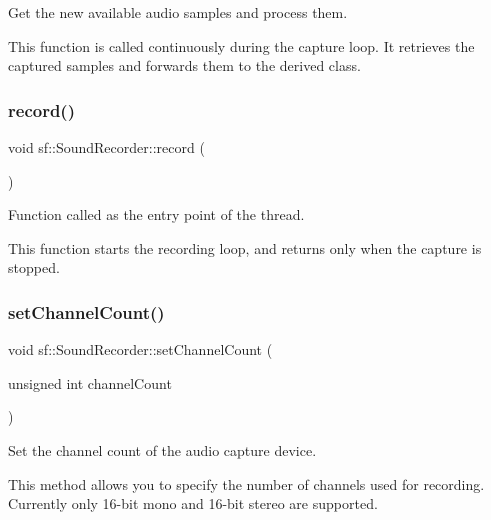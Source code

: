 Get the new available audio samples and process them. 

This function is called continuously during the capture loop. It retrieves the captured samples and forwards them to the derived class. \begin{DoxyVerb}\end{DoxyVerb}
 \mbox{\label{classsf_1_1_sound_recorder_ac7da8331c382707623dc3671094fc176}} 
\subsubsection{\texorpdfstring{record()}{record()}}
{\footnotesize\ttfamily void sf\+::\+Sound\+Recorder\+::record (\begin{DoxyParamCaption}{ }\end{DoxyParamCaption})\hspace{0.3cm}{\ttfamily [private]}}



Function called as the entry point of the thread. 

This function starts the recording loop, and returns only when the capture is stopped. \begin{DoxyVerb}\end{DoxyVerb}
 \mbox{\label{classsf_1_1_sound_recorder_ae4e22ba67d12a74966eb05fad55a317c}} 
\subsubsection{\texorpdfstring{setChannelCount()}{setChannelCount()}}
{\footnotesize\ttfamily void sf\+::\+Sound\+Recorder\+::set\+Channel\+Count (\begin{DoxyParamCaption}\item[{unsigned int}]{channel\+Count }\end{DoxyParamCaption})}



Set the channel count of the audio capture device. 

This method allows you to specify the number of channels used for recording. Currently only 16-\/bit mono and 16-\/bit stereo are supported.


